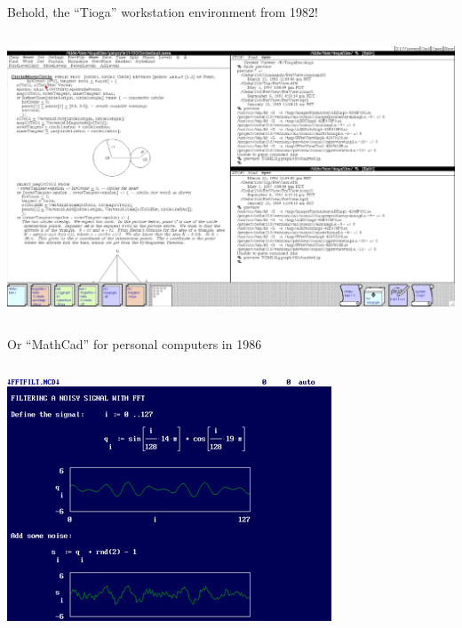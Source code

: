 \documentclass[aspectratio=169]{beamer}
\begin{document}
\begin{frame}{Behold, the ``Tioga'' workstation environment from 1982!}
\vspace{0.2 cm}
\begin{columns}
\includegraphics[width=\linewidth]{../img/screenshot-1982-cedar-tioga.png}
\end{columns}
\end{frame}

\begin{frame}{Or ``MathCad'' for personal computers in 1986}
\vspace{0.2 cm}
\begin{columns}
\includegraphics[width=\linewidth]{../img/screenshot-1986-mathcad.png}
\end{columns}
\end{frame}
\end{document}
